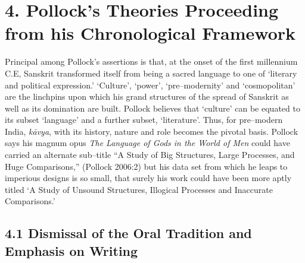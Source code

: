 \section*{4. Pollock’s Theories Proceeding from his Chronological Framework}

Principal among Pollock’s assertions is that, at the onset of the first millennium C.E, Sanskrit transformed itself from being a sacred language to one of ‘literary and political expression.’ ‘Culture’, ‘power’, ‘pre–modernity’ and ‘cosmopolitan’ are the linchpins upon which his grand structures of the spread of Sanskrit as well as its domination are built. Pollock believes that ‘culture’ can be equated to its subset ‘language’ and a further subset, ‘literature’. Thus, for pre–modern India, \textit{kāvya}, with its history, nature and role becomes the pivotal basis. Pollock says his magnum opus \textit{The Language of Gods in the World of Men} could have carried an alternate sub–title “A Study of Big Structures, Large Processes, and Huge Comparisons,” (Pollock 2006:2) but his data set from which he leaps to imperious designs is so small, that surely his work could have been more aptly titled ‘A Study of Unsound Structures, Illogical Processes and Inaccurate Comparisons.’

\subsection*{4.1 Dismissal of the Oral Tradition and Emphasis on Writing}

